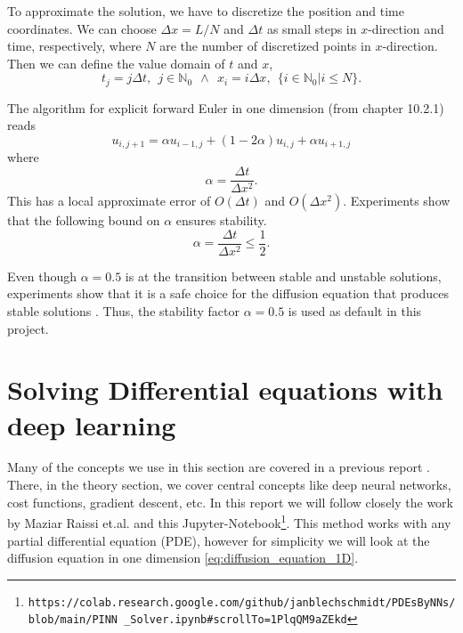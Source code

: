 \documentclass[12pt]{extarticle}
\begin{document}
To approximate the solution, we have to discretize the position and time coordinates. We can choose  $\Delta x = L/N$ and $\Delta t$ as small steps in $x$-direction and time, respectively, where $N$ are the number of discretized points in $x$-direction. Then we can define the value domain of $t$ and $x$,
\begin{equation*}
t_j = j\Delta t, \ \ j\in \mathbb{N}_0 \ \ \wedge \ \ x_i = i\Delta x, \ \ \{i \in \mathbb{N}_0 | i \leq N\}.
\end{equation*}

The algorithm for explicit forward Euler in one dimension (from \cite{lectures2015} chapter 10.2.1) reads
\begin{equation}
\label{eq:forward_euler}
u_{i, j+1} = \alpha u_{i-1, j} + (1 - 2\alpha) u_{i,j} + \alpha u_{i+1, j}
\end{equation}
where
\begin{equation*}
\alpha = \frac{\Delta t}{\Delta x^2}.
\end{equation*}
This has a local approximate error of $O(\Delta t)$ and $O(\Delta x ^2)$. Experiments show that the following bound on $\alpha$ ensures stability.
\begin{equation}
	\label{eq:stability}
	\alpha = \frac{\Delta t}{\Delta x^2} \le \frac{1}{2}.
\end{equation} 

Even though $\alpha = 0.5$ is at the transition between stable and unstable solutions, experiments show that it is a safe choice for the diffusion equation that produces stable solutions \cite{Linge2017}. Thus, the stability factor $\alpha=0.5$ is used as default in this project. 

\section{Solving Differential equations with deep learning}
Many of the concepts we use in this section are covered in a previous report \cite{project2}. There, in the theory section, we cover central concepts like deep neural networks, cost functions, gradient descent, etc. In this report we will follow closely the work by Maziar Raissi et.al. \cite{raissi2017physics} and this Jupyter-Notebook\footnote{\texttt{https://colab.research.google.com/github/janblechschmidt/PDEsByNNs/blob/main/PINN \_Solver.ipynb\#scrollTo=1PlqQM9aZEkd}}. This method works with any partial differential equation (PDE), however for simplicity we will look at the diffusion equation in one dimension \eqref{eq:diffusion_equation_1D}. 
\end{document}
